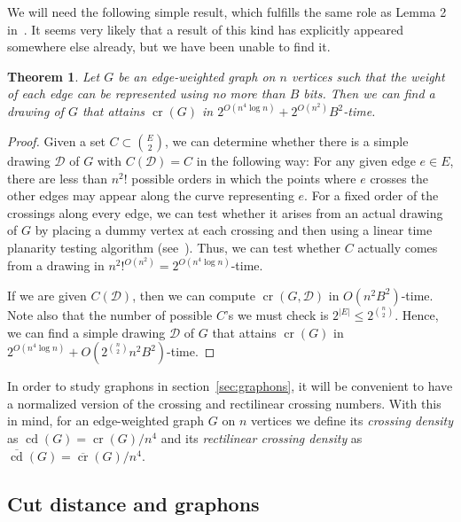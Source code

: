 \documentclass{article}
\newcounter{contSect} \numberwithin{contSect}{section}
\newtheorem{theorem}[contSect]{Theorem}
\begin{document}
We will need the following simple result, which fulfills the same role as Lemma 2 in~\cite{approximatingrect}. It seems very likely that a result of this kind has explicitly appeared somewhere else already, but we have been unable to find it.

\begin{theorem}\label{teo:exactcr}
    Let $G$ be an edge-weighted graph on $n$ vertices such that the weight of each edge can be represented using no more than $B$ bits. Then we can find a drawing of $G$ that attains $\mathop{\mathrm{cr}}(G)$ in $2^{O(n^4\log n)}+2^{O(n^2)}B^2$-time.
\end{theorem}

\begin{proof}
    Given a set $C\subset\binom{E}{2}$, we can determine whether there is a simple drawing $\mathcal{D}$ of $G$ with $C(\mathcal{D})=C$ in the following way: For any given edge $e\in E$, there are less than $n^2!$ possible orders in which the points where $e$ crosses the other edges may appear along the curve representing $e$. For a fixed order of the crossings along every edge, we can test whether it arises from an actual drawing of $G$ by placing a dummy vertex at each crossing and then using a linear time planarity testing algorithm (see~\cite{patrignani2013planarity}). Thus, we can test whether $C$ actually comes from a drawing in $n^2!^{O(n^2)}=2^{O(n^4\log n)}$-time.
  
    If we are given $C(\mathcal{D})$, then we can compute $\mathop{\mathrm{cr}}(G,\mathcal{D})$ in $O(n^2B^2)$-time. Note also that the number of possible $C$'s we must check is $2^{|E|}\leq 2^{\binom{n}{2}}$. Hence, we can find a simple drawing $\mathcal{D}$ of $G$ that attains $\mathop{\mathrm{cr}}(G)$ in $2^{O(n^4\log n)}+O(2^{\binom{n}{2}}n^2B^2)$-time.
\end{proof}

In order to study graphons in section~\ref{sec:graphons}, it will be convenient to have a normalized version of the crossing and rectilinear crossing numbers. With this in mind, for an edge-weighted graph $G$ on $n$ vertices we define its \textit{crossing density} as $\mathop{\mathrm{cd}}(G)=\mathop{\mathrm{cr}}(G)/n^4$ and its \textit{rectilinear crossing density} as $\overline{\mathop{\mathrm{cd}}}(G)=\overline{\mathop{\mathrm{cr}}}(G)/n^4$.

\subsection{Cut distance and graphons}\label{sec:cutdistance}
\end{document}
